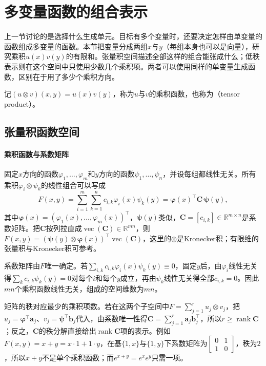 
\section{多变量函数的组合表示}
\label{sec:apx-multivariate}

上一节讨论的是选择什么生成单元。目标有多个变量时，还要决定怎样由单变量的函数组成多变量的函数。本节把变量分成两组$x$与$y$（每组本身也可以是向量），研究乘积$u(x)v(y)$的有限和。张量积空间描述全部这样的组合能张成什么；低秩表示则在这个空间中只使用少数几个乘积项。两者可以使用同样的单变量生成函数，区别在于用了多少个乘积方向。

记$(u\otimes v)(x,y)=u(x)v(y)$，称为$u$与$v$的乘积函数，也称为（tensor product）。

\subsection{张量积函数空间}
\label{sec:apx-tensor-product}

\paragraph{乘积函数与系数矩阵}

固定$x$方向的函数$\varphi_1,\ldots,\varphi_m$和$y$方向的函数$\psi_1,\ldots,\psi_n$，并设每组都线性无关。所有乘积$\varphi_i\otimes\psi_k$的线性组合可以写成
\begin{equation}
  F(x,y)=\sum_{i=1}^m\sum_{k=1}^n c_{i,k}\varphi_i(x)\psi_k(y)=\bm\varphi(x)^{\top}\bm C\,\bm\psi(y),
  \label{eq:apx-coefficient-matrix}
\end{equation}
其中$\bm\varphi(x)=(\varphi_1(x),\ldots,\varphi_m(x))^{\top}$，$\bm\psi(y)$类似，$\bm C=[c_{i,k}]\in\mathbb R^{m\times n}$是系数矩阵。把$\bm C$按列拉直成$\operatorname{vec}(\bm C)\in\mathbb R^{mn}$，则$F(x,y)=(\bm\psi(y)\otimes\bm\varphi(x))^{\top}\operatorname{vec}(\bm C)$，这里的$\otimes$是Kronecker积；有限维的张量积与Kronecker积可参考。

系数矩阵由$F$唯一确定。若$\sum_{i,k}c_{i,k}\varphi_i(x)\psi_k(y)\equiv0$，固定$y$后，由$\varphi_i$线性无关得$\sum_kc_{i,k}\psi_k(y)=0$对每个$i$和每个$y$成立，再由$\psi_k$线性无关得全部$c_{i,k}=0$。因此$mn$个乘积函数线性无关，组成的空间维数为$mn$。

矩阵的秩对应最少的乘积项数。若在这两个子空间中$F=\sum_{j=1}^ru_j\otimes v_j$，把$u_j=\bm\varphi^{\top}\bm a_j$、$v_j=\bm\psi^{\top}\bm b_j$代入，由系数唯一性得$\bm C=\sum_{j=1}^r\bm a_j\bm b_j^{\top}$，所以$r\ge\operatorname{rank}\bm C$；反之，$\bm C$的秩分解直接给出$\operatorname{rank}\bm C$项的表示。例如$F(x,y)=x+y=x\cdot1+1\cdot y$，在基$\{1,x\}$与$\{1,y\}$下系数矩阵为$\left[\begin{smallmatrix}0&1\\1&0\end{smallmatrix}\right]$，秩为$2$，所以$x+y$不是单个乘积函数；而$e^{x+y}=e^xe^y$只需一项。

